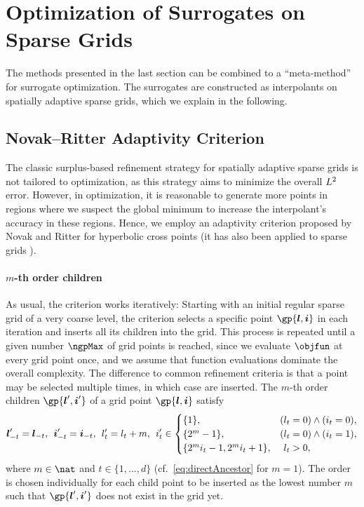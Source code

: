 \section{Optimization of Surrogates on Sparse Grids}
\label{sec:52method}


\noindent
The methods presented in the last section can be combined to a
``meta-method'' for surrogate optimization.
The surrogates are constructed as interpolants on spatially adaptive
sparse grids, which we explain in the following.



\subsection{Novak--Ritter Adaptivity Criterion}
\label{sec:521novakRitter}

The classic surplus-based refinement strategy for
spatially adaptive sparse grids is not tailored to optimization,
as this strategy aims to minimize the overall $L^2$ error.
However, in optimization, it is reasonable to generate more
points in regions where we suspect the global minimum
to increase the interpolant's accuracy in these regions.
Hence, we employ an adaptivity criterion proposed by
Novak and Ritter \cite{Novak96Global} for hyperbolic cross points
(it has also been applied to sparse grids
).

\paragraph{$m$-th order children}

As usual, the criterion works iteratively:
Starting with an initial regular sparse grid of a very coarse level,
the criterion selects a specific point $\gp{\*l,\*i}$ in each iteration
and inserts all its children into the grid.
This process is repeated until a given number $\ngpMax$ of grid points is
reached,
since we evaluate $\objfun$ at every grid point once, and we assume that
function evaluations dominate the overall complexity.
The difference to common refinement criteria is that
a point may be selected multiple times, in which case
 are inserted.
The $m$-th order children $\gp{\*l',\*i'}$ of a grid point $\gp{\*l,\*i}$
satisfy
\begin{equation}
  \label{eq:indirectChild}
  {\boldsymbol{l}}'_{-t} = {\boldsymbol{l}}_{-t},\;\,
  {\boldsymbol{i}}'_{-t} = {\boldsymbol{i}}_{-t},\;\,
  l'_t = l_t + m,\;\,
  i'_t \in
  \begin{cases}
    \{1\},&(l_t = 0) \land (i_t = 0),\\
    \{2^m - 1\},&(l_t = 0) \land (i_t = 1),\\
    \{2^m i_t - 1, 2^m i_t + 1\},&\hphantom{(}l_t > 0,
  \end{cases}
\end{equation}
where $m \in \nat$ and $t \in \{1, \dotsc, d\}$
(cf.\ \eqref{eq:directAncestor} for $m = 1$).
The order is chosen individually for each child point to be inserted
as the lowest number $m$ such that $\gp{\*l',\*i'}$ does not exist
in the grid yet.

